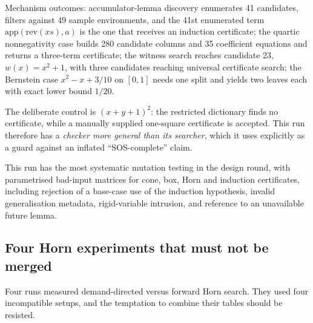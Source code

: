 Mechanism outcomes: accumulator-lemma discovery enumerates 41 candidates,
filters against 49 sample environments, and the 41st enumerated term
$\mathrm{app}(\mathrm{rev}(xs),a)$ is the one that receives an induction
certificate; the quartic nonnegativity case builds 280 candidate columns and 35
coefficient equations and returns a three-term certificate; the witness search
reaches candidate 23, $w(x)=x^2+1$, with three candidates reaching universal
certificate search; the Bernstein case $x^2-x+3/10$ on $[0,1]$ needs one split
and yields two leaves each with exact lower bound $1/20$.

The deliberate control is $(x+y+1)^2$: the restricted dictionary finds no
certificate, while a manually supplied one-square certificate is accepted. This
run therefore has a \emph{checker more general than its searcher}, which it uses
explicitly as a guard against an inflated ``SOS-complete'' claim.

This run has the most systematic mutation testing in the design round, with
parametrised
bad-input matrices for cone, box, Horn and induction certificates, including
rejection of a base-case use of the induction hypothesis, invalid generalisation
metadata, rigid-variable intrusion, and reference to an unavailable future
lemma.

\subsection{Four Horn experiments that must not be merged}

Four runs measured demand-directed versus forward Horn search. They used four
incompatible setups, and the temptation to combine their tables should be
resisted.

